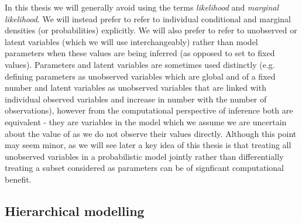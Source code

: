 In this thesis we will generally avoid using the terms \emph{likelihood} and \emph{marginal likelihood}. We will instead prefer to refer to individual conditional and marginal densities (or probabilities) explicitly. We will also prefer to refer to unobserved or latent variables (which we will use interchangeably) rather than model parameters when these values are being inferred (as opposed to set to fixed values). Parameters and latent variables are sometimes used distinctly (e.g. defining parameters as unobserved variables which are global and of a fixed number and latent variables as unobserved variables that are linked with individual observed variables and increase in number with the number of observations), however from the computational perspective of inference both are equivalent - they are variables in the model which we assume we are uncertain about the value of as we do not observe their values directly. Although this point may seem minor, as we will see later a key idea of this thesis is that treating all unobserved variables in a probabilistic model jointly rather than differentially treating a subset considered as parameters can be of signficant computational benefit.




\subsection{Hierarchical modelling}

